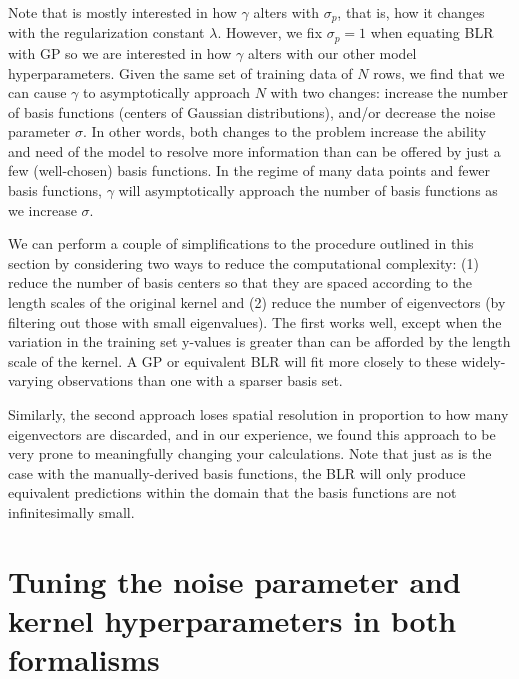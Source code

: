 \documentclass{article}
\begin{document}
Note that \cite{bishop} is mostly interested in how $\gamma$ alters with $\sigma_p$, that is, how it changes with the regularization constant $\lambda$. However, we fix $\sigma_p=1$ when equating BLR with GP so we are interested in how $\gamma$ alters with our other model hyperparameters. Given the same set of training data of $N$ rows, we find that we can cause $\gamma$ to asymptotically approach $N$ with two changes: increase the number of basis functions (centers of Gaussian distributions), and/or decrease the noise parameter $\sigma$. In other words, both changes to the problem increase the ability and need of the model to resolve more information than can be offered by just a few (well-chosen) basis functions. In the regime of many data points and fewer basis functions, $\gamma$ will asymptotically approach the number of basis functions as we increase $\sigma$.

We can perform a couple of simplifications to the procedure outlined in this section by considering two ways to reduce the computational complexity: (1) reduce the number of basis centers so that they are spaced according to the length scales of the original kernel and (2) reduce the number of eigenvectors (by filtering out those with small eigenvalues). The first works well, except when the variation in the training set y-values is greater than can be afforded by the length scale of the kernel. A GP or equivalent BLR will fit more closely to these widely-varying observations than one with a sparser basis set. 

Similarly, the second approach loses spatial resolution in proportion to how many eigenvectors are discarded, and in our experience, we found this approach to be very prone to meaningfully changing your calculations. Note that just as is the case with the manually-derived basis functions, the BLR will only produce equivalent predictions within the domain that the basis functions are not infinitesimally small.

\section{Tuning the noise parameter and kernel hyperparameters in both formalisms}\label{sec:hyperparameter_tuning}
\end{document}
